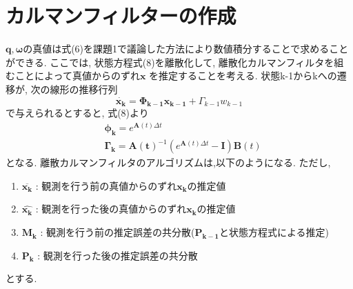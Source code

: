 \documentclass[class=article, crop=false, dvipdfmx, fleqn]{standalone}
\begin{document}
\section{カルマンフィルターの作成}
$\bm{q},\bm{\omega}$の真値は式(6)を課題1で議論した方法により数値積分することで求めることができる.
ここでは, 状態方程式(8)を離散化して, 離散化カルマンフィルタを組むことによって真値からのずれ$\bm{x}$
を推定することを考える.
状態k-1からkへの遷移が, 次の線形の推移行列
\begin{equation}
  \dot{\bm{x_k}} = \bm{\Phi_{k-1}}\bm{x_{k-1}} + \Gamma_{k-1}w_{k-1}
\end{equation}
で与えられるとすると, 式(8)より
\begin{align}
  & \bm{\phi_{k}} = e^{\bm{A}(t)\Delta t} \\
  & \bm{\Gamma_{k}} = \bm{A(t)}^{-1}(e^{\bm{A}(t)\Delta t} - \bm{I})\bm{B}(t)
\end{align}
となる. 離散カルマンフィルタのアルゴリズムは,以下のようになる.
ただし,
\begin{enumerate}
  \item $\overline{\bm{x_k}}$ : 観測を行う前の真値からのずれ$\bm{x_k}$の推定値
  \item $\hat{\bm{x_k}}$ : 観測を行った後の真値からのずれ$\bm{x_k}$の推定値
  \item $\bm{M_k}$ : 観測を行う前の推定誤差の共分散($\bm{P_{k-1}}$と状態方程式による推定)
  \item $\bm{P_k}$ : 観測を行った後の推定誤差の共分散
\end{enumerate}
とする.
\end{document}
